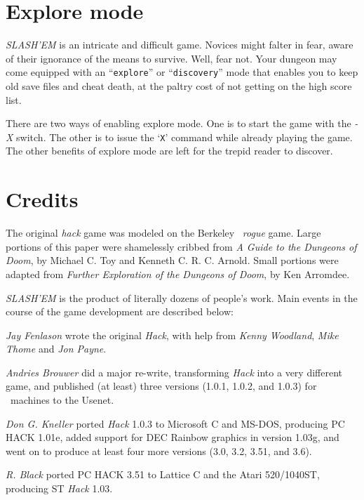 \section{Explore mode}


{\it SLASH'EM\/} is an intricate and difficult game.  Novices might falter
in fear, aware of their ignorance of the means to survive.  Well, fear
not.  Your dungeon may come equipped with an ``{\tt explore}'' or ``{\tt discovery}''
mode that enables you to keep old save files and cheat death, at the
paltry cost of not getting on the high score list.

There are two ways of enabling explore mode.  One is to start the game
with the
{\it -X\/} 
switch.  The other is to issue the `{\tt X}' command while already playing
the game.  The other benefits of explore mode are left for the trepid
reader to discover.

\section{Credits}


The original {\it hack\/} game was modeled on the Berkeley 
\UNIX\ 
{\it rogue\/} game.  Large portions of this paper were shamelessly
cribbed from {\it A Guide to the Dungeons of Doom}, by Michael C. Toy
and Kenneth C. R. C. Arnold.  Small portions were adapted from
{\it Further Exploration of the Dungeons of Doom}, by Ken Arromdee.

{\it SLASH'EM\/} is the product of literally dozens of people's work.
Main events in the course of the game development are described below:


{\it Jay Fenlason\/} wrote the original {\it Hack}, with help from
{\it Kenny Woodland}, {\it Mike Thome\/} and {\it Jon Payne}.

{\it Andries Brouwer\/} did a major re-write, transforming {\it Hack\/} into a
very different game, and published (at least) three versions (1.0.1,
1.0.2, and 1.0.3) for
\UNIX\ 
machines to the Usenet.

{\it Don G. Kneller\/} ported {\it Hack\/} 1.0.3 to Microsoft C and MS-DOS, producing PC
HACK 1.01e, added support for DEC Rainbow graphics in version 1.03g, and went
on to produce at least four more versions (3.0, 3.2, 3.51, and 3.6).

{\it R. Black\/} ported PC HACK 3.51 to Lattice C and the Atari 520/1040ST,
producing ST {\it Hack\/} 1.03.

